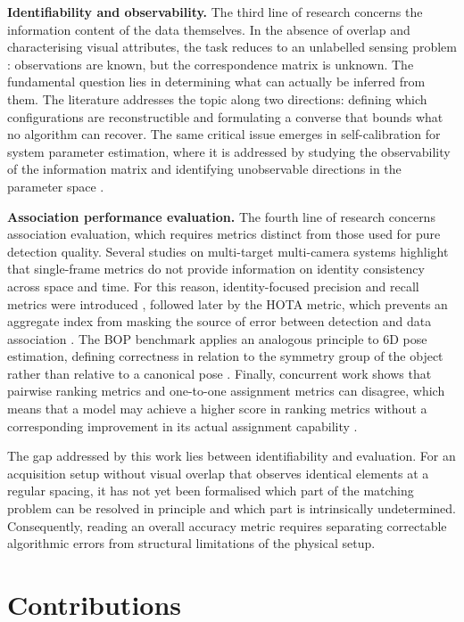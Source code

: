 \documentclass[a4paper, 12pt, twoside]{book}
\newcommand{\citev}[1]{\citeauthor{#1} \citeyear{#1} \cite{#1}}
\begin{document}
\textbf{Identifiability and observability.} The third line of research concerns the information content of the data themselves. In the absence of overlap and characterising visual attributes, the task reduces to an unlabelled sensing problem \citev{unnikrishnan2018}: observations are known, but the correspondence matrix is unknown. The fundamental question lies in determining what can actually be inferred from them. The literature addresses the topic along two directions: defining which configurations are reconstructible and formulating a converse that bounds what no algorithm can recover. The same critical issue emerges in self-calibration for system parameter estimation, where it is addressed by studying the observability of the information matrix \citev{maye2016} and identifying unobservable directions in the parameter space \citev{nobre2019}.

\textbf{Association performance evaluation.} The fourth line of research concerns association evaluation, which requires metrics distinct from those used for pure detection quality. Several studies on multi-target multi-camera systems highlight that single-frame metrics do not provide information on identity consistency across space and time. For this reason, identity-focused precision and recall metrics were introduced \citev{ristani2016}, followed later by the HOTA metric, which prevents an aggregate index from masking the source of error between detection and data association \citev{luiten2021}. The BOP benchmark applies an analogous principle to 6D pose estimation, defining correctness in relation to the symmetry group of the object rather than relative to a canonical pose \citev{hodan2020}. Finally, concurrent work shows that pairwise ranking metrics and one-to-one assignment metrics can disagree, which means that a model may achieve a higher score in ranking metrics without a corresponding improvement in its actual assignment capability \citev{shelukhan2026}.

The gap addressed by this work lies between identifiability and evaluation. For an acquisition setup without visual overlap that observes identical elements at a regular spacing, it has not yet been formalised which part of the matching problem can be resolved in principle and which part is intrinsically undetermined. Consequently, reading an overall accuracy metric requires separating correctable algorithmic errors from structural limitations of the physical setup.

\section{Contributions}
\label{sec:intro-contributions}
\end{document}
